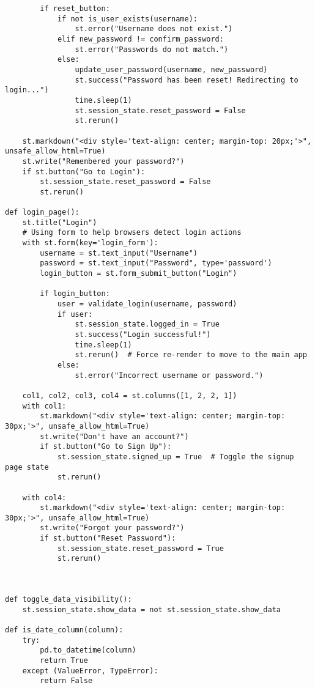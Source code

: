 \documentclass[10pt]{report}
\begin{document}
\begin{center}
\begin{lstlisting}
        if reset_button:
            if not is_user_exists(username):
                st.error("Username does not exist.")
            elif new_password != confirm_password:
                st.error("Passwords do not match.")
            else:
                update_user_password(username, new_password)
                st.success("Password has been reset! Redirecting to login...")
                time.sleep(1)
                st.session_state.reset_password = False
                st.rerun()

    st.markdown("<div style='text-align: center; margin-top: 20px;'>", unsafe_allow_html=True)
    st.write("Remembered your password?")
    if st.button("Go to Login"):
        st.session_state.reset_password = False
        st.rerun()

def login_page():
    st.title("Login")
    # Using form to help browsers detect login actions
    with st.form(key='login_form'):
        username = st.text_input("Username")
        password = st.text_input("Password", type='password')
        login_button = st.form_submit_button("Login")

        if login_button:
            user = validate_login(username, password)
            if user:
                st.session_state.logged_in = True
                st.success("Login successful!")
                time.sleep(1)
                st.rerun()  # Force re-render to move to the main app
            else:
                st.error("Incorrect username or password.")

    col1, col2, col3, col4 = st.columns([1, 2, 2, 1])
    with col1:
        st.markdown("<div style='text-align: center; margin-top: 30px;'>", unsafe_allow_html=True)
        st.write("Don't have an account?")
        if st.button("Go to Sign Up"):
            st.session_state.signed_up = True  # Toggle the signup page state
            st.rerun() 

    with col4:
        st.markdown("<div style='text-align: center; margin-top: 30px;'>", unsafe_allow_html=True)
        st.write("Forgot your password?")
        if st.button("Reset Password"):
            st.session_state.reset_password = True
            st.rerun()

       

def toggle_data_visibility():
    st.session_state.show_data = not st.session_state.show_data

def is_date_column(column):
    try:
        pd.to_datetime(column)
        return True
    except (ValueError, TypeError):
        return False


\end{lstlisting}
\end{center}
\end{document}
